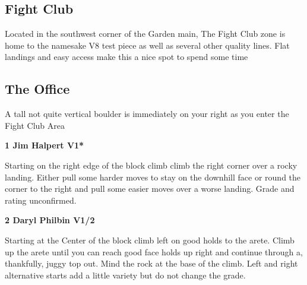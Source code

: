 \begin{multicols}{2}
		\section{Fight Club}\label{sa:Fight Club}
	\begin{minipage}{\columnwidth}
	Located in the southwest corner of the Garden main, The Fight Club zone is home to the namesake V8 test piece as well as several other quality lines. Flat landings and easy access make this a nice spot to spend some time
	\end{minipage}
	
			\begin{minipage}{\columnwidth}
			\subsection*{The Office}\label{bf:The Office}
			A tall not quite vertical boulder is immediately on your right as you enter the Fight Club Area
			
			\end{minipage}
			
					\begin{minipage}{\linewidth}	
					\label{rt:Jim Halpert}
\colorbox{green!20}{
\parbox{0.95\textwidth}{
\textbf{
1 Jim Halpert V1*  \warn \warn 
}
}
}

					\begin{adjustwidth}{0.5cm}{}				
					Starting on the right edge of the block climb climb the right corner over a rocky landing. Either pull some harder moves to stay on the downhill face or round the corner to the right and pull some easier moves over a worse landing. Grade and rating unconfirmed.
					\end{adjustwidth}
					\end{minipage}

					\begin{minipage}{\linewidth}	
					\label{rt:Daryl Philbin}
\colorbox{green!20}{
\parbox{0.95\textwidth}{
\textbf{
2 Daryl Philbin V1/2     \warn \warn 
}
}
}

					\begin{adjustwidth}{0.5cm}{}				
					Starting at the Center of the block climb left on good holds to the arete. Climb up the arete until you can reach good face holds up right and continue through a, thankfully, juggy top out. Mind the rock at the base of the climb. Left and right alternative starts add a little variety but do not change the grade.
					\end{adjustwidth}
					\end{minipage}
			\begin{minipage}{\columnwidth}

\end{minipage}
\end{multicols}
